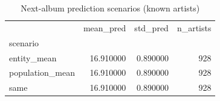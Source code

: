 \begin{table}[htbp]
\caption{Next-album prediction scenarios (known artists)}
\label{tab:prediction_scenarios}
\begin{tabular}{lrrr}
\toprule
 & mean\_pred & std\_pred & n\_artists \\
scenario &  &  &  \\
\midrule
entity\_mean & 16.910000 & 0.890000 & 928 \\
population\_mean & 16.910000 & 0.890000 & 928 \\
same & 16.910000 & 0.890000 & 928 \\
\bottomrule
\end{tabular}
\end{table}
